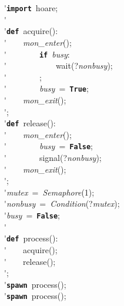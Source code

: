 \'\>\texttt{\textbf{import}}~hoare;\\

\'\>\\

\'\>\texttt{\textbf{def}}~acquire():\\

\'\>~~~~\textit{mon\_enter}();\\

\'\>~~~~~~~~\texttt{\textbf{if}}~\textit{busy}:\\

\'\>~~~~~~~~~~~~wait(?\textit{nonbusy});\\

\'\>~~~~~~~~;\\

\'\>~~~~~~~~\textit{busy}~=~\texttt{\textbf{True}};\\

\'\>~~~~\textit{mon\_exit}();\\

\'\>;\\

\'\>\texttt{\textbf{def}}~release():\\

\'\>~~~~\textit{mon\_enter}();\\

\'\>~~~~~~~~\textit{busy}~=~\texttt{\textbf{False}};\\

\'\>~~~~~~~~signal(?\textit{nonbusy});\\

\'\>~~~~\textit{mon\_exit}();\\

\'\>;\\

\'\>\textit{mutex}~=~\textit{Semaphore}(1);\\

\'\>\textit{nonbusy}~=~\textit{Condition}(?\textit{mutex});\\

\'\>\textit{busy}~=~\texttt{\textbf{False}};\\

\'\>\\

\'\>\texttt{\textbf{def}}~process():\\

\'\>~~~~acquire();\\

\'\>~~~~release();\\

\'\>;\\

\'\>\texttt{\textbf{spawn}}~process();\\

\'\>\texttt{\textbf{spawn}}~process();